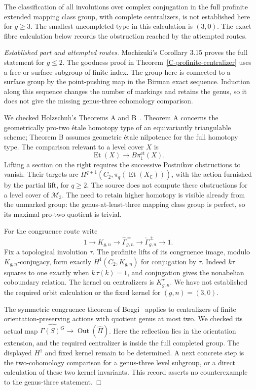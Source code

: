 \begin{proposition}
\label{C-high-genus-open}
The classification of all involutions over complex
conjugation in the full profinite extended mapping
class group, with complete centralizers, is not
established here for $g\geq3$. The smallest
uncompleted type in this calculation is $(3,0)$.
The exact fibre calculation below records the
obstruction reached by the attempted routes.
\end{proposition}
\begin{proof}[Established part and attempted routes]
Mochizuki's Corollary 3.15 proves the full
statement for $g\leq2$. The goodness proof
in Theorem~\ref{C-profinite-centralizer}
uses a free or surface subgroup of finite
index. The group here is connected to
a surface group by the point-pushing
map in the Birman exact sequence.
Induction along this sequence changes
the number of markings and retains
the genus, so it does not give the
missing genus-three cohomology
comparison.

We checked Holzschuh's Theorems A and
B~\cite{Holzschuh2025}. Theorem A
concerns the geometrically pro-two
étale homotopy type of an equivariantly
triangulable scheme; Theorem B assumes
geometric étale nilpotence for the
full homotopy type. The comparison
relevant to a level cover $X$ is
\[
 \operatorname{Et}(X)\longrightarrow
 B\pi_1^{\mathrm{et}}(X).
\]
Lifting a section on the right
requires the successive Postnikov
obstructions to vanish. Their
targets are
$H^{q+1}(C_2,\pi_q(\operatorname{Et}(X_{\mathbb C})))$,
with the action furnished by the
partial lift, for $q\geq2$.
The source does not compute these
obstructions for a level cover
of $\mathcal M_3$. The need to
retain higher homotopy is visible
already from the unmarked group:
the genus-at-least-three mapping
class group is perfect, so its
maximal pro-two quotient is trivial.

For the congruence route write
\[
 1\to K_{g,n}\to\widehat\Gamma^{\,\pm}_{g,n}
       \to\check\Gamma^{\,\pm}_{g,n}\to1 .
\]
Fix a topological involution $\tau$.
The profinite lifts of its congruence
image, modulo $K_{g,n}$-conjugacy,
form exactly $H^1(C_2,K_{g,n})$
for conjugation by $\tau$.
Indeed $k\tau$ squares to one
exactly when $k\,\tau(k)=1$,
and conjugation gives the
nonabelian coboundary relation.
The kernel on centralizers is
$K_{g,n}^{\tau}$.
We have not established the required
orbit calculation or the fixed
kernel for $(g,n)=(3,0)$.

The symmetric congruence theorem
of Boggi~\cite{Boggi2026} applies
to centralizers of finite
orientation-preserving actions
with quotient genus at most two.
We checked its actual map
$\widehat{\Gamma(S)^G}\to
\operatorname{Out}(\widehat\Pi)$.
Here the reflection lies in
the orientation extension, and
the required centralizer is
inside the full completed group.
The displayed $H^1$ and fixed
kernel remain to be determined.
A next concrete step is the
two-cohomology comparison for
a genus-three level subgroup,
or a direct calculation of
these two kernel invariants.
This record asserts no
counterexample to the
genus-three statement.
\end{proof}


